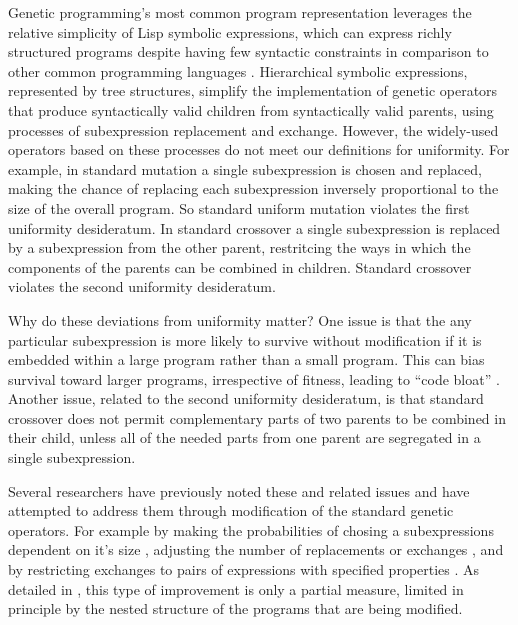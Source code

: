 \documentclass[graybox]{svmult}
\begin{document}
Genetic programming's most common program representation leverages the relative simplicity of Lisp symbolic expressions, which can express richly structured programs despite having few syntactic constraints in comparison to other common programming languages \cite{koza:book}. Hierarchical symbolic expressions, represented by tree structures, simplify the implementation of genetic operators that produce syntactically valid children from syntactically valid parents, using processes of subexpression replacement and exchange. However, the widely-used operators based on these processes do not meet our definitions for uniformity. For example, in standard mutation a single subexpression is chosen and replaced, making the chance of replacing each subexpression inversely proportional to the size of the overall program. So standard uniform mutation violates the first uniformity desideratum. In standard crossover a single subexpression is replaced by a subexpression from the other parent, restritcing the ways in which the components of the parents can be combined in children. Standard crossover violates the second uniformity desideratum.

Why do these deviations from uniformity matter? One issue is that the any particular subexpression is more likely to survive without modification if it is embedded within a large program rather than a small program. This can bias survival toward larger programs, irrespective of fitness, leading to ``code bloat'' \cite{Luke:2006:EC:FIXED}. Another issue, related to the second uniformity desideratum, is that standard crossover does not permit complementary parts of two parents to be combined in their child, unless all of the needed parts from one parent are segregated in a single subexpression.

Several researchers have previously noted these and related issues and have attempted to address them through modification of the standard genetic operators. For example by making the probabilities of chosing a subexpressions dependent on it's size \cite{koza:book,Helmuth:2011:GECCOcomp}, adjusting the number of replacements or exchanges \cite{vanbelle:2002:EuroGP:NOERROR}, and by restricting exchanges to pairs of expressions with specified properties \cite{page:CSRP-98-20,poli:1998:local,poli:2000:22par}. As detailed in \cite{Spector:2013:GPTP}, this type of improvement is only a partial measure, limited in principle by the nested structure of the programs that are being modified.
\end{document}
